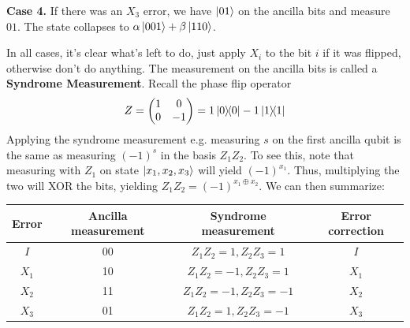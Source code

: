 \noindent
\textbf{Case 4.} If there was an $X_3$ error, we have $\ket{01}$ on the ancilla bits and measure $01$.
The state collapses to $\alpha \ket{001} + \beta \ket{110}$.

In all cases, it's clear what's left to do, just apply $X_i$ to the bit $i$ if it was flipped, otherwise don't do anything.
The measurement on the ancilla bits is called a \textbf{Syndrome Measurement}.
Recall the phase flip operator
\[ Z = \begin{pmatrix}
    1 & 0 \\ 0 & -1
\end{pmatrix} = 1 \ketbra{0} - 1 \ketbra{1} \]
Applying the syndrome measurement e.g. measuring $s$ on the first ancilla qubit
is the same as measuring $(-1)^s$ in the basis $Z_1 Z_2$. To see this, note that measuring with
$Z_1$ on state $\ket{x_1, x_2, x_3}$ will yield $(-1)^{x_1}$. Thus, multiplying the two will XOR the bits, yielding $Z_1Z_2 = (-1)^{x_1 \oplus x_2}$.
We can then summarize:
\begin{center}
\begin{tabular}{ | c | c | c | c | }
    Error & Ancilla measurement & Syndrome measurement & Error correction \\ \hline
    $I$ & 00 & $Z_1 Z_2 = 1, Z_2 Z_3 = 1$ & $I$ \\ 
    $X_1$ & 10 & $Z_1 Z_2 = -1, Z_2 Z_3 = 1$ & $X_1$ \\
    $X_2$ & 11 & $Z_1 Z_2 = -1, Z_2 Z_3 = -1$ & $X_2$ \\
    $X_3$ & 01 & $Z_1 Z_2 = 1, Z_2 Z_3 = -1$ & $X_3$ \\
\end{tabular}
\end{center}

